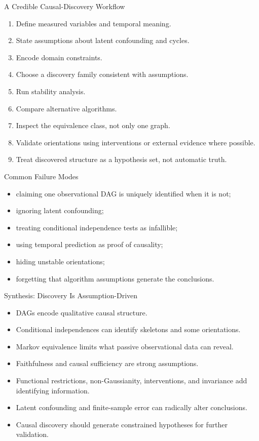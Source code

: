 \documentclass[aspectratio=169,11pt]{beamer}
\begin{document}
\begin{frame}{A Credible Causal-Discovery Workflow}
\begin{enumerate}
\item Define measured variables and temporal meaning.
\item State assumptions about latent confounding and cycles.
\item Encode domain constraints.
\item Choose a discovery family consistent with assumptions.
\item Run stability analysis.
\item Compare alternative algorithms.
\item Inspect the equivalence class, not only one graph.
\item Validate orientations using interventions or external evidence where possible.
\item Treat discovered structure as a hypothesis set, not automatic truth.
\end{enumerate}
\end{frame}

\begin{frame}{Common Failure Modes}
\begin{itemize}
\item claiming one observational DAG is uniquely identified when it is not;
\item ignoring latent confounding;
\item treating conditional independence tests as infallible;
\item using temporal prediction as proof of causality;
\item hiding unstable orientations;
\item forgetting that algorithm assumptions generate the conclusions.
\end{itemize}
\end{frame}

\begin{frame}{Synthesis: Discovery Is Assumption-Driven}
\begin{itemize}
\item DAGs encode qualitative causal structure.
\item Conditional independences can identify skeletons and some orientations.
\item Markov equivalence limits what passive observational data can reveal.
\item Faithfulness and causal sufficiency are strong assumptions.
\item Functional restrictions, non-Gaussianity, interventions, and invariance add identifying information.
\item Latent confounding and finite-sample error can radically alter conclusions.
\item Causal discovery should generate constrained hypotheses for further validation.
\end{itemize}
\end{frame}
\end{document}
